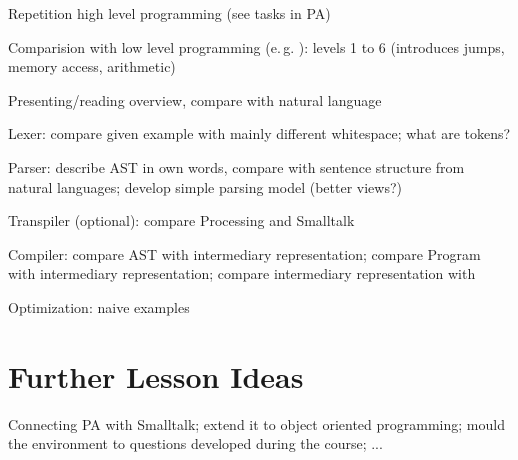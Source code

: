 \begin{todo}
\item Repetition high level programming (see tasks in PA)
\item Comparision with low level programming (e.\,g. \cite{Tom15}): levels 1 to 6 (introduces jumps, memory access, arithmetic)
\item Presenting/reading overview, compare with natural language
\item Lexer: compare given example with mainly different whitespace; what are tokens?
\item Parser: describe AST in own words, compare with sentence structure from natural languages; develop simple parsing model (better views?)
\item Transpiler (optional): compare Processing and Smalltalk
\item Compiler: compare AST with intermediary representation; compare Program with intermediary representation; compare intermediary representation with \cite{Tom15}
\item Optimization: naive examples
\end{todo}



\section{Further Lesson Ideas} \label{sc_lesson_other}

Connecting PA with Smalltalk; extend it to object oriented programming; mould the environment to questions developed during the course; ...
